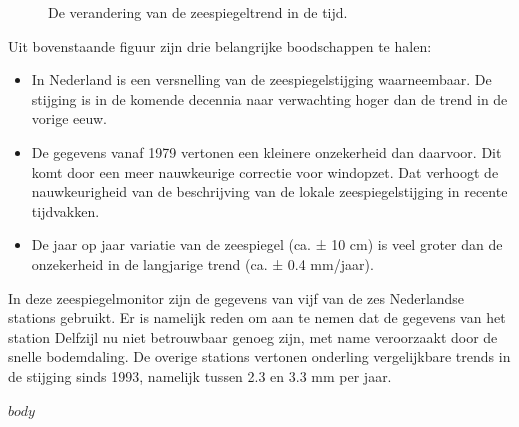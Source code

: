 \documentclass[signature, dutch, biblatex]{deltares_report}
\begin{document}
{\begin{figure}[h]
{}

\caption{De verandering van de zeespiegeltrend in de tijd.}\label{fig:unnamed-chunk-2}
\end{figure}

Uit bovenstaande figuur zijn drie belangrijke boodschappen te halen:

\begin{itemize}
\tightlist
\item
  In Nederland is een versnelling van de zeespiegelstijging waarneembaar. De stijging is in de komende decennia naar verwachting hoger dan de trend in de vorige eeuw.
\item
  De gegevens vanaf 1979 vertonen een kleinere onzekerheid dan daarvoor. Dit komt door een meer nauwkeurige correctie voor windopzet. Dat verhoogt de nauwkeurigheid van de beschrijving van de lokale zeespiegelstijging in recente tijdvakken.
\item
  De jaar op jaar variatie van de zeespiegel (ca. ± 10 cm) is veel groter dan de onzekerheid in de langjarige trend (ca. ± 0.4 mm/jaar).
\end{itemize}

In deze zeespiegelmonitor zijn de gegevens van vijf van de zes Nederlandse stations gebruikt. Er is namelijk reden om aan te nemen dat de gegevens van het station Delfzijl nu niet betrouwbaar genoeg zijn, met name veroorzaakt door de snelle bodemdaling. De overige stations vertonen onderling vergelijkbare trends in de stijging sinds 1993, namelijk tussen 2.3 en 3.3 mm per jaar.
}
\deltarestitle


$body$

\end{document}
